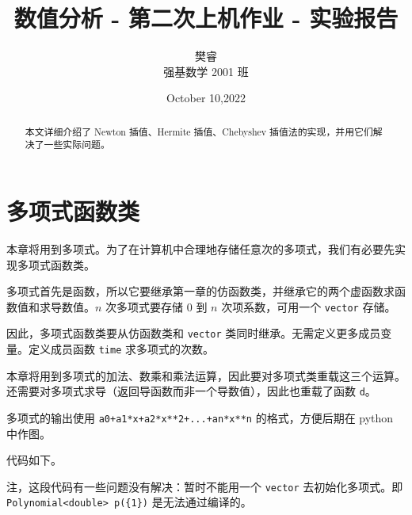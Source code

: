 \documentclass{ctexart}
\title{数值分析 - 第二次上机作业 - 实验报告}
\author{樊睿\\强基数学 2001 班}
\date{October 10,2022}
\begin{document}
\maketitle

\begin{abstract}
本文详细介绍了 Newton 插值、Hermite 插值、Chebyshev 插值法的实现，并用它们解决了一些实际问题。
\end{abstract}

\section{多项式函数类}
本章将用到多项式。为了在计算机中合理地存储任意次的多项式，我们有必要先实现多项式函数类。

多项式首先是函数，所以它要继承第一章的仿函数类，并继承它的两个虚函数求函数值和求导数值。$n$ 次多项式要存储 $0$ 到 $n$ 次项系数，可用一个 \verb|vector| 存储。

因此，多项式函数类要从仿函数类和 \verb|vector| 类同时继承。无需定义更多成员变量。定义成员函数 \verb|time| 求多项式的次数。

本章将用到多项式的加法、数乘和乘法运算，因此要对多项式类重载这三个运算。还需要对多项式求导（返回导函数而非一个导数值），因此也重载了函数 \verb|d|。

多项式的输出使用 \verb|a0+a1*x+a2*x**2+...+an*x**n| 的格式，方便后期在 python 中作图。

代码如下。

注，这段代码有一些问题没有解决：暂时不能用一个 \verb|vector| 去初始化多项式。即 \verb|Polynomial<double> p({1})| 是无法通过编译的。
\end{document}
